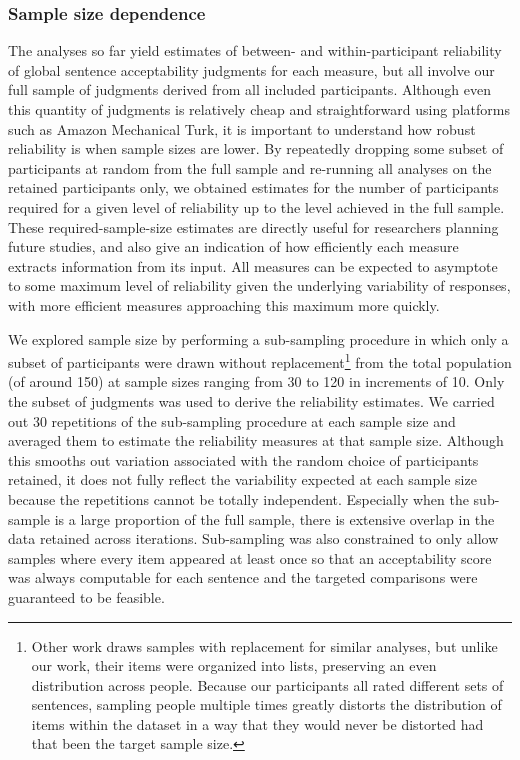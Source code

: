 \documentclass[doc]{apa6}
\begin{document}
\subsubsection{Sample size dependence}

The analyses so far yield estimates of between- and within-participant reliability of global sentence acceptability judgments for each measure, but all involve our full sample of judgments derived from all included participants. Although even this quantity of judgments is relatively cheap and straightforward using platforms such as Amazon Mechanical Turk, it is important to understand how robust reliability is when sample sizes are lower. By repeatedly dropping some subset of participants at random from the full sample and re-running all analyses on the retained participants only, we obtained estimates for the number of participants required for a given level of reliability up to the level achieved in the full sample. These required-sample-size estimates are directly useful for researchers planning future studies, and also give an indication of how efficiently each measure extracts information from its input.  All measures can be expected to asymptote to some maximum level of reliability given the underlying variability of responses, with more efficient measures approaching this maximum more quickly.

We explored sample size by performing a sub-sampling procedure in which only a subset of participants were drawn without replacement\footnote{Other work \citep{sprousealmeida2017sensitivitypower} draws samples with replacement for similar analyses, but unlike our work, their items were organized into lists, preserving an even distribution across people. Because our participants all rated different sets of sentences, sampling people multiple times greatly distorts the distribution of items within the dataset in a way that they would never be distorted had that been the target sample size.} from the total population (of around 150) at sample sizes ranging from 30 to 120 in increments of 10. Only the subset of judgments was used to derive the reliability estimates. We carried out 30 repetitions of the sub-sampling procedure at each sample size and averaged them to estimate the reliability measures at that sample size. Although this smooths out variation associated with the random choice of participants retained, it does not fully reflect the variability expected at each sample size because the repetitions cannot be totally independent. Especially when the sub-sample is a large proportion of the full sample, there is extensive overlap in the data retained across iterations. Sub-sampling was also constrained to only allow samples where every item appeared at least once so that an acceptability score was always computable for each sentence and the targeted comparisons were guaranteed to be feasible.
\end{document}
